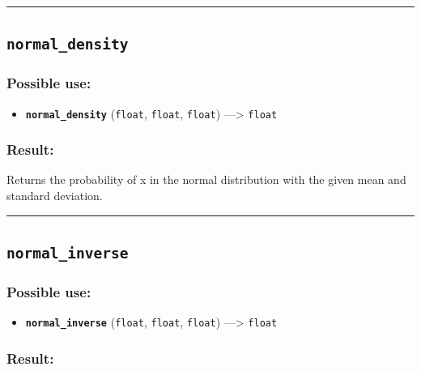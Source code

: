 \documentclass[]{book}
\providecommand{\tightlist}{%
  \setlength{\itemsep}{0pt}\setlength{\parskip}{0pt}}
\theoremstyle{definition}
\theoremstyle{definition}
\theoremstyle{definition}
\theoremstyle{remark}
\begin{document}
\begin{center}\rule{0.5\linewidth}{\linethickness}\end{center}

\subsection{\texorpdfstring{\texttt{normal\_density}}{normal\_density}}\label{normal_density}

\subsubsection{Possible use:}\label{possible-use-378}

\begin{itemize}
\tightlist
\item
  \textbf{\texttt{normal\_density}} (\texttt{float}, \texttt{float},
  \texttt{float}) ---\textgreater{} \texttt{float}
\end{itemize}

\subsubsection{Result:}\label{result-364}

Returns the probability of x in the normal distribution with the given
mean and standard deviation.

\begin{center}\rule{0.5\linewidth}{\linethickness}\end{center}

\subsection{\texorpdfstring{\texttt{normal\_inverse}}{normal\_inverse}}\label{normal_inverse}

\subsubsection{Possible use:}\label{possible-use-379}

\begin{itemize}
\tightlist
\item
  \textbf{\texttt{normal\_inverse}} (\texttt{float}, \texttt{float},
  \texttt{float}) ---\textgreater{} \texttt{float}
\end{itemize}

\subsubsection{Result:}\label{result-365}
\end{document}

